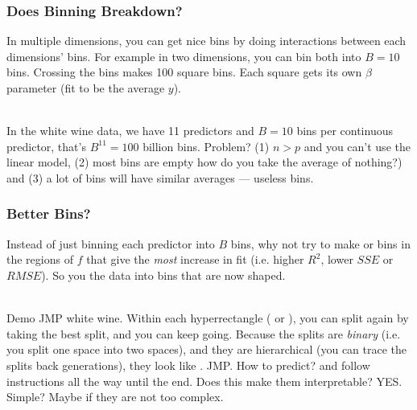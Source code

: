 \documentclass[handout]{beamer}
\begin{document}
\begin{frame}\frametitle{Does Binning Breakdown?}

In multiple dimensions, you can get nice bins by doing interactions between each dimensions' bins. For example in two dimensions, you can bin both into $B=10$ bins. Crossing the bins makes 100 square bins. Each square gets its own $\beta$ parameter (fit to be the average $y$). \\~\\ \pause

In the white wine data, we have 11 predictors and $B=10$ bins per continuous predictor, that's $B^{11} = 100 $ billion  bins. Problem? \pause (1) $n > p$ and you can't use the linear model, \pause (2) most bins are empty how do you take the average of nothing?) and (3) a lot of bins will have similar averages --- useless bins.
	
\end{frame}

\begin{frame}\frametitle{Better Bins?}

Instead of just binning each predictor into $B$ bins, why not try to make  or  bins in the regions of $f$ that give the \emph{most} increase in fit (i.e. higher $R^2$, lower $SSE$ or $RMSE$). So you  the data into bins that are now  shaped. \\~\\ \pause 

Demo JMP white wine. \pause Within each hyperrectangle ( or ), you can split again by taking the best split, and you can keep going. Because the splits are \emph{binary} (i.e. you split one space into two spaces), and they are hierarchical (you can trace the splits back generations), they look like . \pause JMP. \pause How to predict? \pause {}and follow instructions all the way until the end. \pause Does this make them interpretable? \pause YES. Simple? \pause Maybe if they are not too complex.
	
\end{frame}
\end{document}
